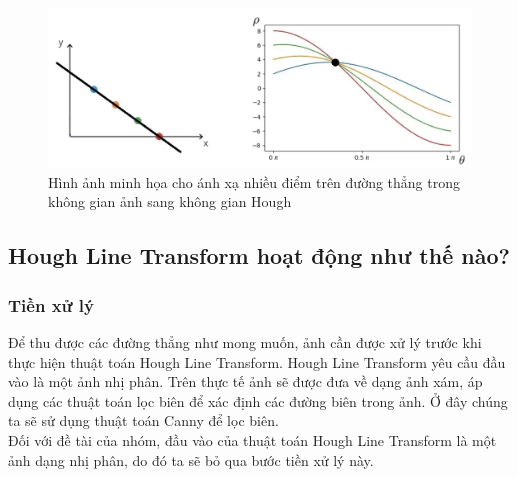 \begin{figure}[htp]
\begin{center}
    \includegraphics[width=14cm]{img/2_Theory/hough_trans_5.png}
    \caption{\centering Hình ảnh minh họa cho ánh xạ nhiều điểm trên đường thẳng trong không gian ảnh sang không gian Hough}
\end{center}
\end{figure}
\subsection{Hough Line Transform hoạt động như thế nào?}
\subsubsection{Tiền xử lý}
\tab Để thu được các đường thẳng như mong muốn, ảnh cần được xử lý trước khi thực hiện thuật toán Hough Line Transform. Hough Line Transform yêu cầu đầu vào là một ảnh nhị phân. Trên thực tế ảnh sẽ được đưa về dạng ảnh xám, áp dụng các thuật toán lọc biên để xác định các đường biên trong ảnh. Ở đây chúng ta sẽ sử dụng thuật toán Canny để lọc biên. \\
\tab Đối với đề tài của nhóm, đầu vào của thuật toán Hough Line Transform là một ảnh dạng nhị phân, do đó ta sẽ bỏ qua bước tiền xử lý này.
